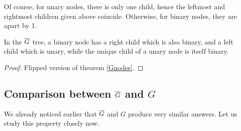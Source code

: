 \documentclass[a4paper,11pt]{article}
\begin{document}
Of course, for unary nodes, there is only one child, hence the
leftmost and rightmost children given above coincide. Otherwise,
for binary nodes, they are apart by 1.

\begin{theorem}
In the $\overline{G}$ tree, a binary node has a right child which is also binary,
and a left child which is unary, while the unique child of a unary
node is itself binary.
\end{theorem}
\begin{proof}
Flipped version of theorem \ref{Gnodes}.
\end{proof}

\subsection{Comparison between $\overline{G}$ and $G$}

We already noticed earlier that $\overline{G}$ and $G$ produce very similar
answers. Let us study this property closely now.
\end{document}
